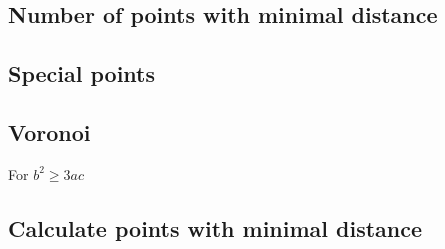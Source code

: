 \documentclass[a4paper]{scrartcl}
\begin{document}
\subsection{Number of points with minimal distance}


\subsection{Special points}

\subsection{Voronoi}

For $b^2 \geq 3ac$

\subsection{Calculate points with minimal distance}
\end{document}
